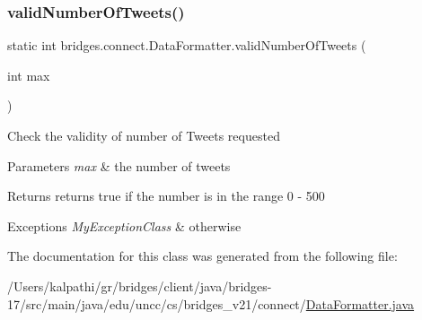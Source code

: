 \subsubsection{\texorpdfstring{valid\+Number\+Of\+Tweets()}{validNumberOfTweets()}}
{\footnotesize\ttfamily static int bridges.\+connect.\+Data\+Formatter.\+valid\+Number\+Of\+Tweets (\begin{DoxyParamCaption}\item[{int}]{max }\end{DoxyParamCaption})\hspace{0.3cm}{\ttfamily [static]}}

Check the validity of number of Tweets requested 
\begin{DoxyParams}{Parameters}
{\em max} & the number of tweets \\
\hline
\end{DoxyParams}
\begin{DoxyReturn}{Returns}
returns true if the number is in the range 0 -\/ 500 
\end{DoxyReturn}

\begin{DoxyExceptions}{Exceptions}
{\em My\+Exception\+Class} & otherwise \\
\hline
\end{DoxyExceptions}


The documentation for this class was generated from the following file\+:\begin{DoxyCompactItemize}
\item 
/\+Users/kalpathi/gr/bridges/client/java/bridges-\/17/src/main/java/edu/uncc/cs/bridges\+\_\+v21/connect/\mbox{\hyperlink{_data_formatter_8java}{Data\+Formatter.\+java}}\end{DoxyCompactItemize}
